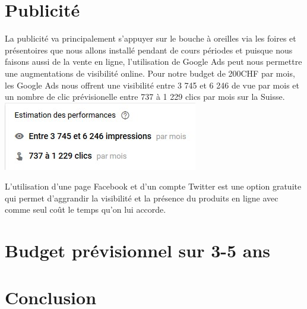 \documentclass{article}
\begin{document}
\section{Publicité}
La publicité va principalement s'appuyer sur le bouche à oreilles via les foires et présentoires que nous allons installé pendant de cours périodes et puisque nous faisons aussi de la vente en ligne, l'utilisation de Google Ads peut nous permettre une augmentations de visibilité online. Pour notre budget de 200CHF par mois, les Google Ads nous offrent une visibilité entre 3 745 et 6 246 de vue par mois et un nombre de clic prévisionelle entre 737 à 1 229 clics par mois sur la Suisse. 
\includegraphics[scale=0.4]{../img/googleAdsPrevision.jpg} 

L'utilisation d'une page Facebook et d'un compte Twitter est une option gratuite qui permet d'aggrandir la visibilité et la présence du produits en ligne avec comme seul coût le temps qu'on lui accorde. 

\section{Budget prévisionnel sur 3-5 ans}

\section{Conclusion}



\end{document}
